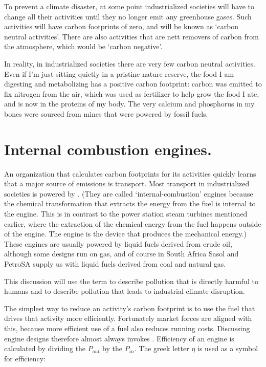 To prevent a climate disaster, at some point industrialized societies will have
to change all their activities until they no longer emit any greenhouse gases.
Such activities will have carbon footprints of zero, and will be known as
`carbon neutral activities'. There are also activities that are nett removers of
carbon from the atmosphere, which would be `carbon negative'.

In reality, in industrialized societies there are very few carbon neutral
activities. Even if I'm just sitting quietly in a pristine nature reserve, the
food I am digesting and metabolizing has a positive carbon footprint: carbon
was emitted to fix nitrogen from the air, which was used as fertilizer to help
grow the food I ate, and is now in the proteins of my body. The very calcium and
phosphorus in my bones were sourced from mines that were powered by fossil
fuels. 

\section{Internal combustion engines.}

An organization that calculates carbon footprints for its activities quickly
learns that a major source of emissions is transport. Most transport in
industrialized societies is powered by . (They are called `internal\hyp{}combustion' engines because the
chemical transformation that extracts the energy from the fuel is internal to
the engine. This is in contrast to the power station steam turbines mentioned
earlier, where the extraction of the chemical energy from the fuel happens
outside of the engine. The engine is the device that produces the mechanical
energy.) These engines are usually powered by liquid fuels derived from crude
oil, although some designs run on gas, and of course in South Africa Sasol and
PetroSA supply us with liquid fuels derived from coal and natural gas.

This discussion will use the term  to describe
pollution that is directly harmful to humans and  to
describe pollution that leads to industrial climate disruption.

The simplest way to reduce an activity's carbon footprint is to use the fuel
that drives that activity more efficiently. Fortunately market forces are
aligned with this, because more efficient use of a fuel also reduces running
costs. Discussing engine designs therefore almost always invokes
. Efficiency of an engine is calculated by dividing the
 \(P_{out}\) by the  \(P_{in}\). The
greek letter \(\eta\) is used as a symbol for efficiency:

